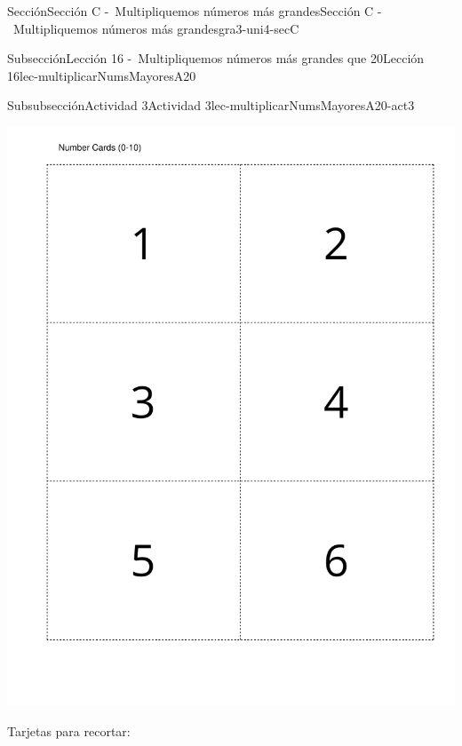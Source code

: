\begin{sectionptx}{Sección}{Sección C -~Multipliquemos números más grandes}{}{Sección C -~Multipliquemos números más grandes}{}{}{gra3-uni4-secC}
\begin{subsectionptx}{Subsección}{Lección 16 -~Multipliquemos números más grandes que 20}{}{Lección 16}{}{}{lec-multiplicarNumsMayoresA20}
\begin{subsubsectionptx}{Subsubsección}{Actividad 3}{}{Actividad 3}{}{}{lec-multiplicarNumsMayoresA20-act3}
\begin{cutoutpage}
\begin{image}{0}{1}{0}{}
\includegraphics[page=2, rotate=90, scale=0.55, trim=40 40 20 40, clip, center] {external/blm/pdf-source/tarjetasDeDigitos.pdf}
\end{image}%
\end{cutoutpage}
\begin{cutoutpage}
Tarjetas para recortar:
\begin{image}{0}{1}{0}{}%

\end{image}
\end{cutoutpage}
\end{subsubsectionptx}
\end{subsectionptx}
\end{sectionptx}
